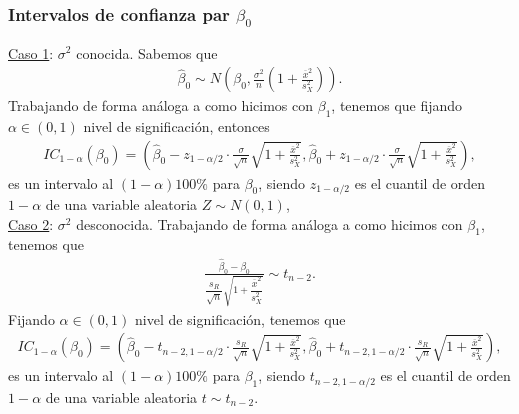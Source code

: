 \subsubsection{Intervalos de confianza par $\beta_0$}
\noindent \underline{Caso 1}: $\sigma^2$ conocida. Sabemos que
\begin{align*}
    \widehat{\beta}_0 \sim N\left( \beta_0, \frac{\sigma^2}{n}\left( 1 + \frac{\overline{x}^2}{s_X^2} \right) \right).
\end{align*}
Trabajando de forma análoga a como hicimos con $\beta_1$, tenemos que fijando $\alpha \in (0,1)$ nivel de significación, entonces
\begin{align*}
    IC_{1-\alpha}(\beta_0) = \left( \widehat{\beta}_0 - z_{1 - \alpha/2} \cdot \frac{\sigma}{\sqrt{n}}\sqrt{1 + \frac{\overline{x}^2}{s_X^2}}, \widehat{\beta}_0 + z_{1 - \alpha/2} \cdot \frac{\sigma}{\sqrt{n}}\sqrt{1 + \frac{\overline{x}^2}{s_X^2}}  \right),
\end{align*}
es un intervalo al $(1- \alpha) 100 \%$ para $\beta_0$, siendo $z_{1 - \alpha/2}$ es el cuantil de orden $1 - \alpha$ de una variable aleatoria $Z \sim N(0,1)$, 
\\
\newline
\noindent \underline{Caso 2}: $\sigma^2$ desconocida. Trabajando de forma análoga a como hicimos con $\beta_1$, tenemos que
\begin{align*}
    \frac{\widehat{\beta}_0 - \beta_0}{\dfrac{s_R}{\sqrt{n}} \sqrt{1 + \dfrac{\overline{x}^2}{s_X^2}}} \sim t_{n-2}.
\end{align*}
Fijando $\alpha \in (0,1)$ nivel de significación, tenemos que 
\begin{align*}
    IC_{1-\alpha}(\beta_0) = \left( \widehat{\beta}_0 - t_{n-2,1 - \alpha/2} \cdot \frac{s_R}{\sqrt{n}}\sqrt{1 + \frac{\overline{x}^2}{s_X^2}}, \widehat{\beta}_0 + t_{n-2,1 - \alpha/2} \cdot \frac{s_R}{\sqrt{n}}\sqrt{1 + \frac{\overline{x}^2}{s_X^2}}  \right),
\end{align*}
es un intervalo al $(1- \alpha) 100 \%$ para $\beta_1$, siendo $t_{n-2,1 - \alpha/2}$ es el cuantil de orden $1 - \alpha$ de una variable aleatoria $t \sim t_{n-2}$.

